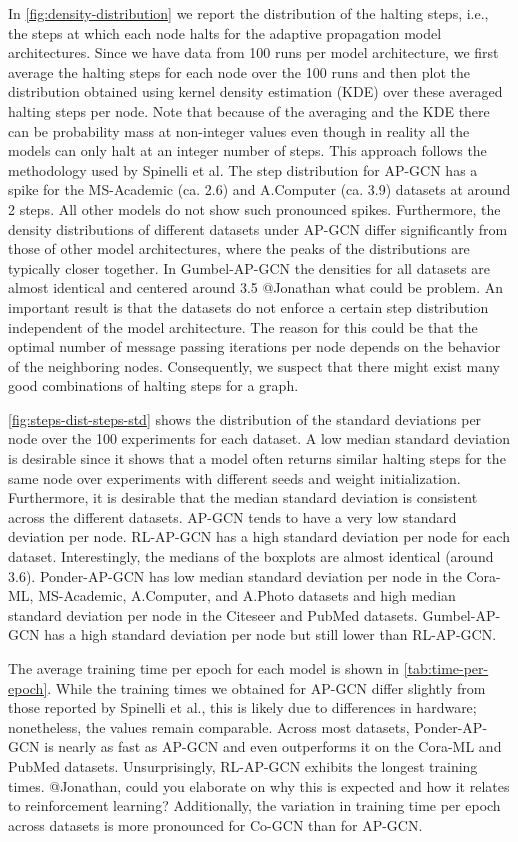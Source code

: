 \documentclass{gdl}
\begin{document}
In \autoref{fig:density-distribution} we report the distribution of the halting steps, i.e., the steps at which each node halts for the adaptive propagation model architectures. Since we have data from 100 runs per model architecture, we first average the halting steps for each node over the 100 runs and then plot the distribution obtained using kernel density estimation (KDE) over these averaged halting steps per node. Note that because of the averaging and the KDE there can be probability mass at non-integer values even though in reality all the models can only halt at an integer number of steps. This approach follows the methodology used by Spinelli et al. The step distribution for AP-GCN has a spike for the MS-Academic (ca. 2.6) and A.Computer (ca. 3.9) datasets at around 2 steps. All other models do not show such pronounced spikes. Furthermore,  the density distributions of different datasets under AP-GCN differ significantly from those of other model architectures, where the peaks of the distributions are typically closer together. In Gumbel-AP-GCN the densities for all datasets are almost identical and centered around 3.5 @Jonathan what could be problem. An important result is that the datasets do not enforce a certain step distribution independent of the model architecture. The reason for this could be that the optimal number of message passing iterations per node depends on the behavior of the neighboring nodes. Consequently, we suspect that there might exist many good combinations of halting steps for a graph.

\autoref{fig:steps-dist-steps-std} shows the distribution of the standard deviations per node over the 100 experiments for each dataset. A low median standard deviation is desirable since it shows that a model often returns similar halting steps for the same node over experiments with different seeds and weight initialization. Furthermore, it is desirable that the median standard deviation is consistent across the different datasets. AP-GCN tends to have a very low standard deviation per node. RL-AP-GCN has a high standard deviation per node for each dataset. Interestingly, the medians of the boxplots are almost identical (around 3.6). Ponder-AP-GCN has low median standard deviation per node in the Cora-ML, MS-Academic, A.Computer, and A.Photo datasets and high median standard deviation per node in the Citeseer and PubMed datasets. Gumbel-AP-GCN has a high standard deviation per node but still lower than RL-AP-GCN. 

The average training time per epoch for each model is shown in \autoref{tab:time-per-epoch}. While the training times we obtained for AP-GCN differ slightly from those reported by Spinelli et al., this is likely due to differences in hardware; nonetheless, the values remain comparable. Across most datasets, Ponder-AP-GCN is nearly as fast as AP-GCN and even outperforms it on the Cora-ML and PubMed datasets. Unsurprisingly, RL-AP-GCN exhibits the longest training times. @Jonathan, could you elaborate on why this is expected and how it relates to reinforcement learning? Additionally, the variation in training time per epoch across datasets is more pronounced for Co-GCN than for AP-GCN.
\end{document}
